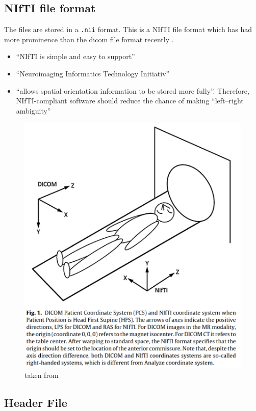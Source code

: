 \documentclass[11pt]{article}
\begin{document}
\subsection{NIfTI file format}

The files are stored in a \texttt{.nii} format. This is a NIfTI file format which has had more prominence than the dicom file format recently \cite{dicom-to-nifti-conversion}. 

\begin{itemize}
    \item ``NIfTI is simple and easy to support''
    \item ``Neuroimaging Informatics Technology Initiativ''\cite{file-formats}
    \item ``allows spatial orientation information to be stored more fully''\cite{dicom-to-nifti-conversion}. Therefore, NIfTI-compliant software should reduce the chance of making ``left–right ambiguity''\cite{file-formats,dicom-to-nifti-conversion}
\end{itemize}

\begin{figure}[H]
    \centering
    \includegraphics[width=.75\linewidth]{images/dicom-nifti.png}
    \caption{taken from \cite{dicom-to-nifti-conversion}}
\end{figure}

\subsection{Header File}
\end{document}

